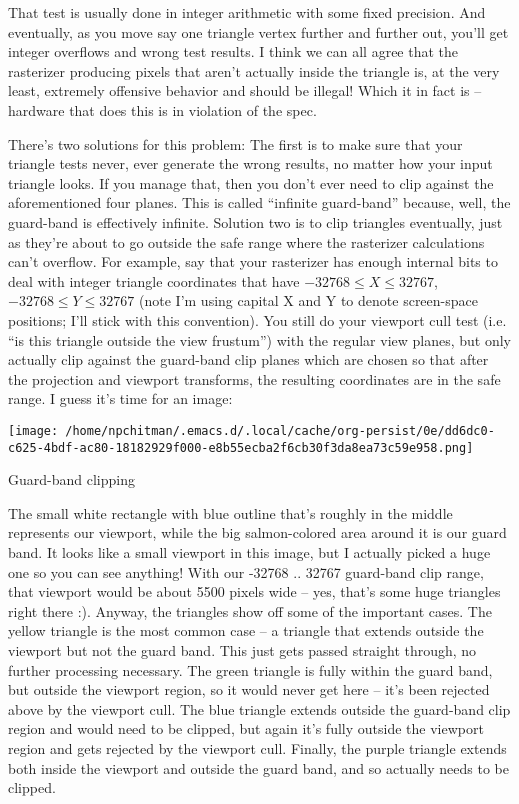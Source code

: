 \documentclass[12pt]{article}
\begin{document}
That test is usually done in integer arithmetic with some fixed precision. And eventually, as you move say one triangle vertex further and further out, you’ll get integer overflows and wrong test results. I think we can all agree that the rasterizer producing pixels that aren’t actually inside the triangle is, at the very least, extremely offensive behavior and should be illegal! Which it in fact is – hardware that does this is in violation of the spec.

There’s two solutions for this problem: The first is to make sure that your triangle tests never, ever generate the wrong results, no matter how your input triangle looks. If you manage that, then you don’t ever need to clip against the aforementioned four planes. This is called “infinite guard-band” because, well, the guard-band is effectively infinite. Solution two is to clip triangles eventually, just as they’re about to go outside the safe range where the rasterizer calculations can’t overflow. For example, say that your rasterizer has enough internal bits to deal with integer triangle coordinates that have \(-32768 \le X \le 32767\), \(-32768 \le Y \le 32767\) (note I’m using capital X and Y to denote screen-space positions; I’ll stick with this convention). You still do your viewport cull test (i.e. “is this triangle outside the view frustum”) with the regular view planes, but only actually clip against the guard-band clip planes which are chosen so that after the projection and viewport transforms, the resulting coordinates are in the safe range. I guess it’s time for an image:
\begin{center}
\texttt{[image: /home/npchitman/.emacs.d/.local/cache/org-persist/0e/dd6dc0-c625-4bdf-ac80-18182929f000-e8b55ecba2f6cb30f3da8ea73c59e958.png]}
\end{center}
            Guard-band clipping

The small white rectangle with blue outline that’s roughly in the middle represents our viewport, while the big salmon-colored area around it is our guard band. It looks like a small viewport in this image, but I actually picked a huge one so you can see anything! With our -32768 .. 32767 guard-band clip range, that viewport would be about 5500 pixels wide – yes, that’s some huge triangles right there :). Anyway, the triangles show off some of the important cases. The yellow triangle is the most common case – a triangle that extends outside the viewport but not the guard band. This just gets passed straight through, no further processing necessary. The green triangle is fully within the guard band, but outside the viewport region, so it would never get here – it’s been rejected above by the viewport cull. The blue triangle extends outside the guard-band clip region and would need to be clipped, but again it’s fully outside the viewport region and gets rejected by the viewport cull. Finally, the purple triangle extends both inside the viewport and outside the guard band, and so actually needs to be clipped.
\end{document}
